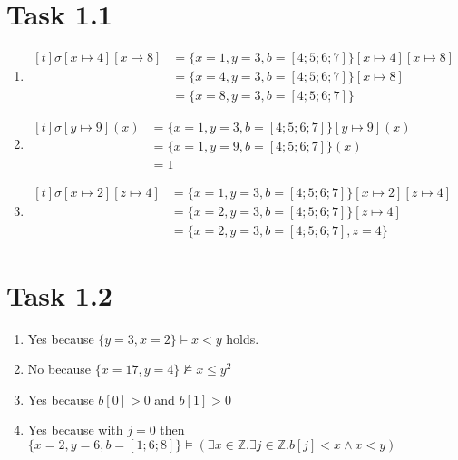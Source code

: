 \documentclass{article}
\author{\hmwkAuthorName}
\date{}
\newcommand{\Z}{\mathbb{Z}}
\begin{document}
	
	
	\section{Task 1.1}
	
		\begin{enumerate}[label={(\alph*)}]
			
			\item
			$\begin{aligned}[t]
				\sigma [x \mapsto 4] [x \mapsto 8] &= \{ x = 1, y = 3, b = [4;5;6;7] \} [x \mapsto 4] [x \mapsto 8] \\
				&= \{ x = 4, y = 3, b = [4;5;6;7] \} [x \mapsto 8] \\
				&= \{ x = 8, y = 3, b = [4;5;6;7] \}
			\end{aligned}$
			
			\item
			$\begin{aligned}[t]
				\sigma [y \mapsto 9] (x) &= \{ x = 1, y = 3, b = [4;5;6;7] \} [y \mapsto 9] (x) \\
				&= \{ x = 1, y = 9, b = [4;5;6;7] \} (x) \\
				&= 1
			\end{aligned}$
			
			\item
			$\begin{aligned}[t]
				\sigma [x \mapsto 2] [z \mapsto 4] &= \{ x = 1, y = 3, b = [4;5;6;7] \} [x \mapsto 2] [z \mapsto 4] \\
				&= \{ x = 2, y = 3, b = [4;5;6;7] \} [z \mapsto 4] \\
				&= \{ x = 2, y = 3, b = [4;5;6;7], z = 4 \}
			\end{aligned}$
			
		\end{enumerate}
	
	\section{Task 1.2}
		\begin{enumerate}[label={(\alph*)}]
			
			\item Yes because $\{y = 3, x = 2 \} \models x < y$ holds.
			
			\item No because $\{x = 17, y = 4\} \not\models x \leq y^2 $
			
			\item Yes because $b[0] > 0$ and $b[1] > 0$
			
			\item Yes because with $j = 0$ then $\{x = 2, y = 6, b = [1;6;8]\} \models (\exists x \in \Z . \exists j \in \Z . b[j] < x \land x < y)$
			
		\end{enumerate}
	
\end{document}
